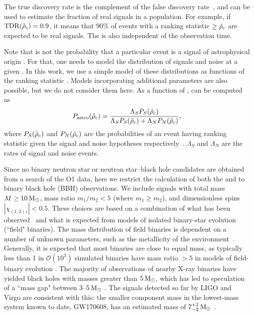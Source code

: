The true discovery rate is the complement of the false discovery rate~\citep{Benjamini:1995ram},
and can be used to estimate the fraction of real signals in a population.
For example, if $\mathrm{TDR}(\tilde{\rho}_c) = 0.9$, it means that
$90\%$ of events with a ranking statistic $\geq \tilde{\rho}_c$ are expected to be real signals.  The
\tdr{} is also independent of the observation time.

Note that \tdr{} is not the probability that a particular event is a signal of astrophysical origin \pastro{}. For that, one needs to model the distribution of signals and noise at a given \rankingstat{}. In this work, we use a simple model of these distributions as functions of the ranking statistic \rankingstat{}. Models incorporating additional parameters are also possible, but we do not consider them here. As a function of \rankingstat, \pastro{} can be computed as
%
\begin{equation}
P_{\mathrm{astro}}(\tilde{\rho}_c) = \frac{\Lambda_S P_S(\tilde{\rho}_c)}{\Lambda_S P_S(\tilde{\rho}_c) + \Lambda_N P_N(\tilde{\rho}_c)},
\end{equation} 
%
where $P_S(\tilde{\rho}_c)$ and $P_N(\tilde{\rho}_c)$ are the probabilities of an event having ranking statistic \rankingstat{} 
given the signal and noise hypotheses respectively~\citep{2009MNRAS.396..165G,Farr:2015,Abbott:2016nhf}. $\Lambda_S$ and $\Lambda_N$ are the rates of signal and noise events.

Since no binary neutron star or neutron star--black hole candidates are obtained from a search of the O1 data, here we restrict the calculation of both the \tdr{} and \pastro{} to binary black hole (BBH) observations.
We include signals with total mass $M \geq 10\,\mathrm{M}_{\odot}$, mass ratio $m_1/m_2 < 5$ (where $m_1 \geq m_2$),
and dimensionless spins $|\chi_{(1,2)z}| <
0.5$. These choices are based on a combination of what has been observed~\citep{TheLIGOScientific:2016pea,GW170104,GW170814,Abbott:2017gyy} and
what is expected from models of isolated binary-star evolution (``field"
binaries). The mass distribution of field binaries is dependent on a number of
unknown parameters, such as the metallicity of the environment~\citep{Belczynski:2014iua}. Generally, it is expected that most binaries are close to equal mass, as typically less than 1
in $\mathcal{O}(10^{3})$ simulated binaries have mass ratio $> 5$ in models of
field-binary evolution \citep{Dominik:2014yma}.  The majority of observations of
nearby X-ray binaries have yielded black holes with masses greater than
$5\,\mathrm{M}_{\odot}$, which has led to speculation of a ``mass gap" between
3--5$\,\mathrm{M}_{\odot}$ \citep{Ozel:2010su, Farr:2010tu, Kreidberg:2012ud}. The signals
detected so far by LIGO and Virgo are consistent with this: the smaller component mass
in the lowest-mass system known to date, GW170608, has an estimated mass of
$7^{+2}_{-2}\,\mathrm{M}_{\odot}$ \citep{Abbott:2017gyy}.

